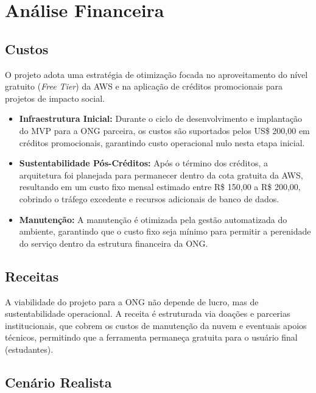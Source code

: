 \chapter{Análise Financeira}
\label{cha:analise-financeira}

\section{Custos}

O projeto adota uma estratégia de otimização focada no aproveitamento do nível gratuito (\textit{Free Tier}) da AWS e na aplicação de créditos promocionais para projetos de impacto social.

\begin{itemize}
    \item \textbf{Infraestrutura Inicial:} Durante o ciclo de desenvolvimento e implantação do MVP para a ONG parceira, os custos são suportados pelos US\$ 200,00 em créditos promocionais, garantindo custo operacional nulo nesta etapa inicial.

    \item \textbf{Sustentabilidade Pós-Créditos:} Após o término dos créditos, a arquitetura foi planejada para permanecer dentro da cota gratuita da AWS, resultando em um custo fixo mensal estimado entre R\$ 150,00 a R\$ 200,00, cobrindo o tráfego excedente e recursos adicionais de banco de dados.

    \item \textbf{Manutenção:} A manutenção é otimizada pela gestão automatizada do ambiente, garantindo que o custo fixo seja mínimo para permitir a perenidade do serviço dentro da estrutura financeira da ONG.
\end{itemize}

\section{Receitas}

A viabilidade do projeto para a ONG não depende de lucro, mas de sustentabilidade operacional. A receita é estruturada via doações e parcerias institucionais, que cobrem os custos de manutenção da nuvem e eventuais apoios técnicos, permitindo que a ferramenta permaneça gratuita para o usuário final (estudantes).

\section{Cenário Realista}

